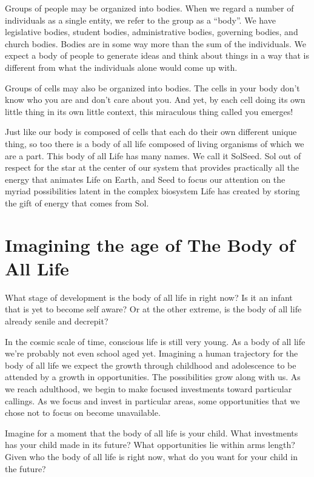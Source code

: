 \documentclass[ebook,12pt,openany,twoside]{memoir}
\begin{document}
\noindent Groups of people may be organized into bodies. When we regard a
number of individuals as a single entity, we refer to the group as a ``body''.
We have legislative bodies, student bodies, administrative bodies, governing
bodies, and church bodies. Bodies are in some way more than the sum of the
individuals. We expect a body of people to generate ideas and think about
things in a way that is different from what the individuals alone would come up
with.

Groups of cells may also be organized into bodies.  The cells in your body don't
know who you are and don't care about you. And yet, by each cell doing its own
little thing in its own little context, this miraculous thing called
you emerges!

Just like our body is composed of cells that each do their own different unique
thing, so too there is a body of all life composed of living organisms of which
we are a part. This body of all Life has many names. We call it SolSeed. Sol
out of respect for the star at the center of our system that provides
practically all the energy that animates Life on Earth, and Seed to focus our
attention on the myriad possibilities latent in the complex biosystem Life has
created by storing the gift of energy that comes from Sol.

\chapter{Imagining the age of The Body of All Life}

What stage of development is the body of all life in right now?
Is it an infant that is yet to become self aware? Or at the other extreme, is
the body of all life already senile and decrepit?

In the cosmic scale of time, conscious life is still very young. As a body of
all life we're probably not even school aged yet. Imagining a human trajectory
for the body of all life we expect the growth through childhood and adolescence
to be attended by a growth in opportunities. The possibilities grow along with
us. As we reach adulthood, we begin to make focused investments toward
particular callings. As we focus and invest in particular areas, some
opportunities that we chose not to focus on become unavailable.

Imagine for a moment that the body of all life is your child. What investments
has your child made in its future? What opportunities lie within arms length?
Given who the body of all life is right now, what do you want for your child in
the future?
\end{document}
